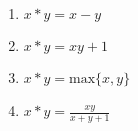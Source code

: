 \documentclass[12pt]{article}
\begin{document}
\begin{flushleft}
\begin{enumerate}
\item $x * y = x - y $
\item $x * y = xy + 1 $
\item $x * y = \text{max}\{x,y\}$
\item $x * y = \frac{xy}{x + y + 1}$
\end{enumerate}













\end{flushleft}
\end{document}
